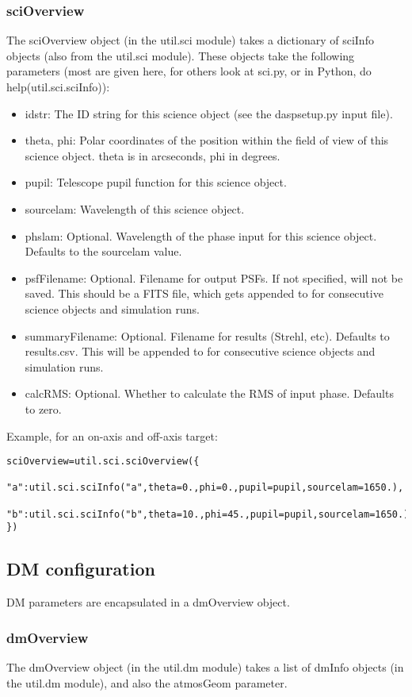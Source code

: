 \documentclass{article}
\begin{document}
\subsubsection{sciOverview}
The sciOverview object (in the util.sci module) takes a dictionary of
sciInfo objects (also from the util.sci module).  These objects take
the following parameters (most are given here, for others look at
sci.py, or in Python, do help(util.sci.sciInfo)):

\begin{itemize}
\item idstr: The ID string for this science object (see the
  daspsetup.py input file).
\item theta, phi: Polar coordinates of the position within the field
  of view of this science object.  theta is in arcseconds, phi in
  degrees.
\item pupil: Telescope pupil function for this science object.
\item sourcelam: Wavelength of this science object.
\item phslam: Optional.  Wavelength of the phase input for this
  science object.  Defaults to the sourcelam value.
\item psfFilename: Optional.  Filename for output PSFs.  If not
  specified, will not be saved.  This should be a FITS file, which
  gets appended to for consecutive science objects and simulation runs.
\item summaryFilename: Optional.  Filename for results (Strehl, etc).
  Defaults to results.csv.  This will be appended to for consecutive
  science objects and simulation runs.
\item calcRMS: Optional.  Whether to calculate the RMS of input
  phase.  Defaults to zero.
\end{itemize}

Example, for an on-axis and off-axis target:
\begin{verbatim}
sciOverview=util.sci.sciOverview({
    "a":util.sci.sciInfo("a",theta=0.,phi=0.,pupil=pupil,sourcelam=1650.),
    "b":util.sci.sciInfo("b",theta=10.,phi=45.,pupil=pupil,sourcelam=1650.),
})
\end{verbatim}

\subsection{DM configuration}
DM parameters are encapsulated in a dmOverview object.  

\subsubsection{dmOverview}
The dmOverview object (in the util.dm module) takes a list of dmInfo
objects (in the util.dm module), and also the atmosGeom parameter.
\end{document}
